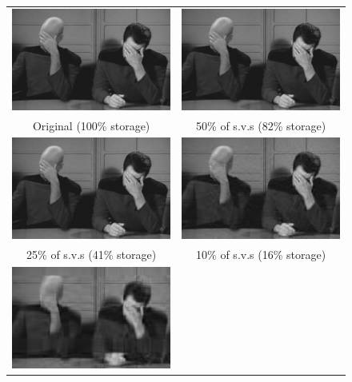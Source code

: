 \documentclass[a4paper]{article}
\begin{document}
\begin{figure}[p]
  \begin{centering}
    \begin{tabular}{cc}
      \includegraphics[width=0.4\columnwidth]{svd_original} &
      \includegraphics[width=0.4\columnwidth]{svd_50} \\
      Original (100\% storage) & 50\% of s.v.s (82\% storage)\\[1em]
      \includegraphics[width=0.4\columnwidth]{svd_25} &
      \includegraphics[width=0.4\columnwidth]{svd_10} \\
      25\% of s.v.s (41\% storage) & 10\% of s.v.s (16\% storage)\\[1em]
      \includegraphics[width=0.4\columnwidth]{svd_5} &

\end{tabular}
\end{centering}
\end{figure}
\end{document}
